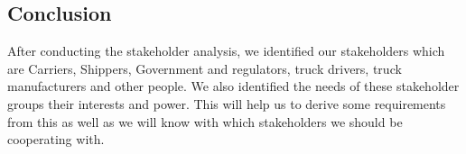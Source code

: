 \subsection{Conclusion}
After conducting the stakeholder analysis, we identified our stakeholders which are Carriers, Shippers, Government and regulators, truck drivers, truck manufacturers and other people. We also identified the needs of these stakeholder groups their interests and power. This will help us to derive some requirements from this as well as we will know with which stakeholders we should be cooperating with.